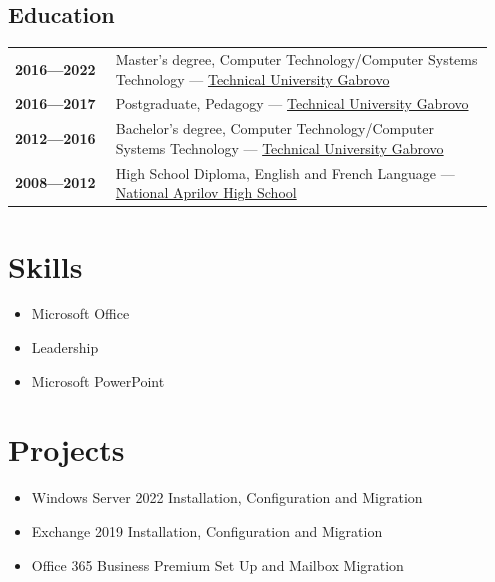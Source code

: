 \documentclass[letterpaper, 10pt]{article}
\begin{document}
\begin{center}
\begin{minipage}[t]{0.5\textwidth}
			\section*{Education}
			\begin{tabular}{@{}p{0.2\linewidth} p{0.75\linewidth}}
				\textbf{2016—2022} & Master's degree, Computer Technology/Computer Systems Technology — \href{https://www.tugab.bg/en/}{Technical University Gabrovo}   \\
				\textbf{2016—2017} & Postgraduate, Pedagogy — \href{https://www.tugab.bg/en/}{Technical University Gabrovo}                                             \\
				\textbf{2012—2016} & Bachelor's degree, Computer Technology/Computer Systems Technology — \href{https://www.tugab.bg/en/}{Technical University Gabrovo} \\
				\textbf{2008—2012} & High School Diploma, English and French Language — \href{https://nag-school.org/}{National Aprilov High School}                    \\
			\end{tabular}
		\end{minipage}
	\end{center}
	
	\begin{center}
		\begin{minipage}[t]{0.5\textwidth}
			\section*{Skills}
			\begin{itemize}
				\item {Microsoft Office}
				
				\item {Leadership}
				
				\item {Microsoft PowerPoint}
			\end{itemize}
		\end{minipage}%
		\begin{minipage}[t]{0.5\textwidth}
			\section*{Projects}
			\begin{itemize}
				\item Windows Server 2022 Installation, Configuration and Migration
				
				\item Exchange 2019 Installation, Configuration and Migration
				
				\item Office 365 Business Premium Set Up and Mailbox Migration
			\end{itemize}
		\end{minipage}
	\end{center}
	
\end{document}
